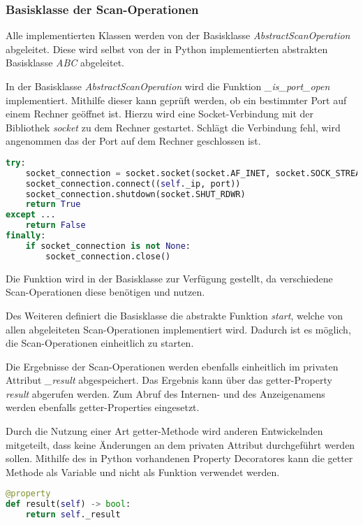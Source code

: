 \subsubsection{Basisklasse der Scan-Operationen}

Alle implementierten Klassen werden von der Basisklasse \textit{AbstractScanOperation} abgeleitet. Diese wird selbst von der in Python implementierten abstrakten Basisklasse \textit{ABC} abgeleitet.

In der Basisklasse \textit{AbstractScanOperation} wird die Funktion \textit{\_is\_port\_open} implementiert. Mithilfe dieser kann geprüft werden, ob ein bestimmter Port auf einem Rechner geöffnet ist. Hierzu wird eine Socket-Verbindung mit der Bibliothek \textit{socket} zu dem Rechner gestartet. Schlägt die Verbindung fehl, wird angenommen das der Port auf dem Rechner geschlossen ist.

\begin{lstlisting}[language=Python, frame=single, caption={Big Brother Funktion is\_port\_open}, captionpos=b, label={lst:bigbrother-port-open}]
try:
	socket_connection = socket.socket(socket.AF_INET, socket.SOCK_STREAM)
	socket_connection.connect((self._ip, port))
	socket_connection.shutdown(socket.SHUT_RDWR)
	return True
except ...
	return False
finally:
	if socket_connection is not None:
		socket_connection.close()
\end{lstlisting}

Die Funktion wird in der Basisklasse zur Verfügung gestellt, da verschiedene Scan-Operationen diese benötigen und nutzen.

Des Weiteren definiert die Basisklasse die abstrakte Funktion \textit{start}, welche von allen abgeleiteten Scan-Operationen implementiert wird. Dadurch ist es möglich, die Scan-Operationen einheitlich zu starten.

Die Ergebnisse der Scan-Operationen werden ebenfalls einheitlich im privaten Attribut \textit{\_result} abgespeichert. Das Ergebnis kann über das getter-Property \textit{result} abgerufen werden. Zum Abruf des Internen- und des Anzeigenamens werden ebenfalls getter-Properties eingesetzt. 

Durch die Nutzung einer Art getter-Methode wird anderen Entwickelnden mitgeteilt, dass keine Änderungen an dem privaten Attribut durchgeführt werden sollen. Mithilfe des in Python vorhandenen Property Decoratores kann die getter Methode als Variable und nicht als Funktion verwendet werden.

\begin{lstlisting}[language=Python, frame=single, caption={Big Brother Ergebnis Getter-Property}, captionpos=b, label={lst:bigbrother-getter-result}]
@property
def result(self) -> bool:
	return self._result
\end{lstlisting}

